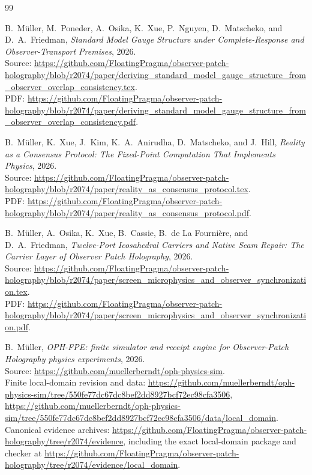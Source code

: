 \documentclass[11pt]{article}
\numberwithin{equation}{section}
\theoremstyle{remark}
\begin{document}
\begin{thebibliography}{99}

B.~M\"uller, M.~Poneder, A.~Osika, K.~Xue, P.~Nguyen, D.~Matscheko, and D.~A.~Friedman,
\emph{Standard Model Gauge Structure under Complete-Response and Observer-Transport Premises},
2026.\\
Source: \url{https://github.com/FloatingPragma/observer-patch-holography/blob/r2074/paper/deriving_standard_model_gauge_structure_from_observer_overlap_consistency.tex}.\\
PDF: \url{https://github.com/FloatingPragma/observer-patch-holography/blob/r2074/paper/deriving_standard_model_gauge_structure_from_observer_overlap_consistency.pdf}.

B.~M\"uller, K.~Xue, J.~Kim, K.~A.~Anirudha, D.~Matscheko, and J.~Hill,
\emph{Reality as a Consensus Protocol: The Fixed-Point Computation That Implements Physics},
2026.\\
Source: \url{https://github.com/FloatingPragma/observer-patch-holography/blob/r2074/paper/reality_as_consensus_protocol.tex}.\\
PDF: \url{https://github.com/FloatingPragma/observer-patch-holography/blob/r2074/paper/reality_as_consensus_protocol.pdf}.

B.~M\"uller, A.~Osika, K.~Xue, B.~Cassie, B.~de La Fourni\`ere, and D.~A.~Friedman,
\emph{Twelve-Port Icosahedral Carriers and Native Seam Repair: The Carrier Layer of Observer Patch Holography},
2026.\\
Source: \url{https://github.com/FloatingPragma/observer-patch-holography/blob/r2074/paper/screen_microphysics_and_observer_synchronization.tex}.\\
PDF: \url{https://github.com/FloatingPragma/observer-patch-holography/blob/r2074/paper/screen_microphysics_and_observer_synchronization.pdf}.

B.~M\"uller,
\emph{OPH-FPE: finite simulator and receipt engine for Observer-Patch
Holography physics experiments},
2026.\\
Source: \url{https://github.com/muellerberndt/oph-physics-sim}.\\
Finite local-domain revision and data:
\url{https://github.com/muellerberndt/oph-physics-sim/tree/550fe77dc67dc8bef2dd8927bcf72ec98cfa3506},
\url{https://github.com/muellerberndt/oph-physics-sim/tree/550fe77dc67dc8bef2dd8927bcf72ec98cfa3506/data/local_domain}.\\
Canonical evidence archives:
\url{https://github.com/FloatingPragma/observer-patch-holography/tree/r2074/evidence}, including the exact
local-domain package and checker at
\url{https://github.com/FloatingPragma/observer-patch-holography/tree/r2074/evidence/local_domain}.


\end{thebibliography}
\end{document}
